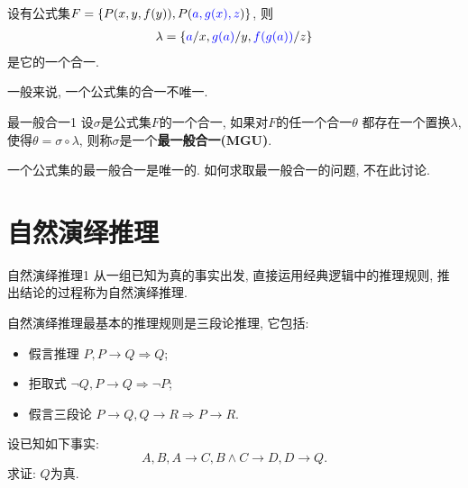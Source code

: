 \begin{example}
设有公式集$F=\{P(x,y,f(y)), P(\textcolor[rgb]{0,0,1}{a,g(x),z})\}$, 则
\begin{align}
  \lambda =\{\textcolor[rgb]{0,0,1}{a}/x, \textcolor[rgb]{0,0,1}{g(a)}/y, \textcolor[rgb]{0,0,1}{f(g(a))}/z\}
\end{align}
是它的一个合一.
\end{example}

\begin{remark}
  一般来说, 一个公式集的合一不唯一.
\end{remark}

\begin{mydef}{最一般合一}{1}
设$\sigma$是公式集$F$的一个合一, 如果对$F$的任一个合一$\theta$ 都存在一个置换$\lambda$, 使得$\theta =\sigma \circ \lambda$, 则称$\sigma$是一个\textbf{最一般合一(MGU)}.
\end{mydef}

\begin{remark}
  一个公式集的最一般合一是唯一的. 如何求取最一般合一的问题, 不在此讨论.
\end{remark}

\section{自然演绎推理}
\begin{mydef}{自然演绎推理}{1}
    从一组已知为真的事实出发, 直接运用经典逻辑中的推理规则, 推出结论的过程称为自然演绎推理.
\end{mydef}

自然演绎推理最基本的推理规则是三段论推理, 它包括:
\begin{itemize}
    \item 假言推理         $P,  P\rightarrow Q \Rightarrow  Q$;
    \item 拒取式            $\neg Q,  P\rightarrow Q \Rightarrow \neg P$;
    \item 假言三段论     $P\rightarrow Q,  Q\rightarrow R \Rightarrow  P\rightarrow R$.
\end{itemize}

\begin{example}\label{C3examp0355}
设已知如下事实:
          $$A,  B,  A\rightarrow C,  B\wedge C\rightarrow D,  D\rightarrow Q.$$
求证: $Q$为真.
\end{example}

